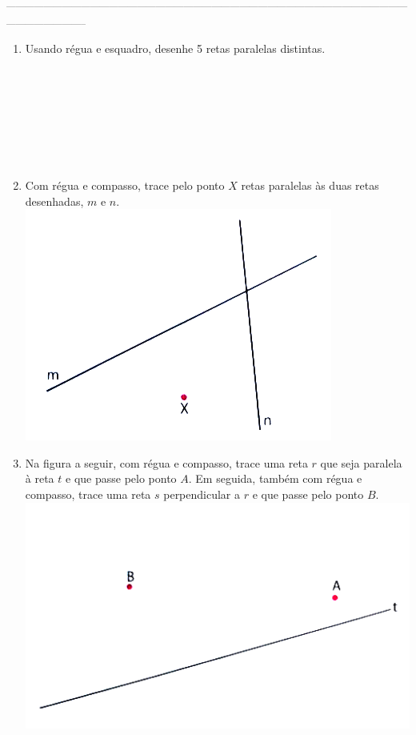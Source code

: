 \documentclass[a4paper,14pt]{article}
\begin{document}
	\noindent\textsubscript{-----------------------------------------------------------------------------------------------------------------------------------------------------------}
    \begin{multicols}{2}
    	\begin{enumerate}
   			\item Usando régua e esquadro, desenhe 5 retas paralelas distintas. \\\\\\\\\\\\\\\\
   			\item Com régua e compasso, trace pelo ponto $X$ retas paralelas às duas retas desenhadas, $m$ e $n$. \\
   			\includegraphics[width=1\linewidth]{6FMA70_imagens/imagem4} \\
   			\item Na figura a seguir, com régua e compasso, trace uma reta $r$ que seja paralela à reta $t$ e que passe pelo ponto $A$. Em seguida, também com régua e compasso, trace uma reta $s$ perpendicular a $r$ e que passe pelo ponto $B$. \\
   			\includegraphics[width=1\linewidth]{6FMA70_imagens/imagem5} \\

\end{enumerate}
\end{multicols}
\end{document}
